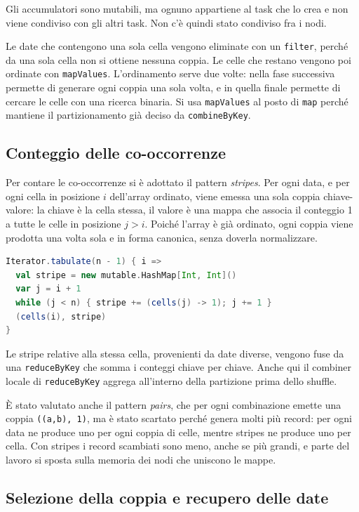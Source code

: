 \documentclass[11pt,a4paper]{article}
\begin{document}
Gli accumulatori sono mutabili, ma ognuno appartiene al task che lo crea e non viene condiviso con
gli altri task. Non c'è quindi stato condiviso fra i nodi.

Le date che contengono una sola cella vengono eliminate con un \texttt{filter}, perché da una sola
cella non si ottiene nessuna coppia. Le celle che restano vengono poi ordinate con
\texttt{mapValues}. L'ordinamento serve due volte: nella fase successiva permette di generare ogni
coppia una sola volta, e in quella finale permette di cercare le celle con una ricerca binaria. Si
usa \texttt{mapValues} al posto di \texttt{map} perché mantiene il partizionamento già deciso da
\texttt{combineByKey}.

\subsection{Conteggio delle co-occorrenze}

Per contare le co-occorrenze si è adottato il pattern \emph{stripes}. Per ogni data, e per ogni
cella in posizione $i$ dell'array ordinato, viene emessa una sola coppia chiave-valore: la chiave
è la cella stessa, il valore è una mappa che associa il conteggio 1 a tutte le celle in posizione
$j > i$. Poiché l'array è già ordinato, ogni coppia viene prodotta una volta sola e in forma
canonica, senza doverla normalizzare.

\begin{lstlisting}[language=Scala]
Iterator.tabulate(n - 1) { i =>
  val stripe = new mutable.HashMap[Int, Int]()
  var j = i + 1
  while (j < n) { stripe += (cells(j) -> 1); j += 1 }
  (cells(i), stripe)
}
\end{lstlisting}

Le stripe relative alla stessa cella, provenienti da date diverse, vengono fuse da una
\texttt{reduceByKey} che somma i conteggi chiave per chiave. Anche qui il combiner locale di
\texttt{reduceByKey} aggrega all'interno della partizione prima dello shuffle.

È stato valutato anche il pattern \emph{pairs}, che per ogni combinazione emette una coppia
\texttt{((a,b), 1)}, ma è stato scartato perché genera molti più record: per ogni data
ne produce uno per ogni coppia di celle, mentre stripes ne produce uno per cella. 
Con stripes i record scambiati sono meno, anche se più grandi, e parte del lavoro si sposta sulla memoria dei
nodi che uniscono le mappe.

\subsection{Selezione della coppia e recupero delle date}
\end{document}
